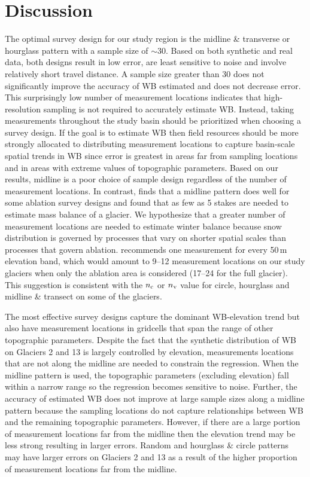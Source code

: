 \documentclass[twocolumn,letterpaper]{igs}
\begin{document}
\section{Discussion}

The optimal survey design for our study region is the midline \& transverse or hourglass pattern with a sample size of $\sim30$. Based on both synthetic and real data, both designs result in low error, are least sensitive to noise and involve relatively short travel distance. A sample size greater than 30 does not significantly improve the accuracy of WB estimated and does not decrease error. This surprisingly low number of measurement locations indicates that high-resolution sampling is not required to accurately estimate WB. Instead, taking measurements throughout the study basin should be prioritized when choosing a survey design. If the goal is to estimate WB then field resources should be more strongly allocated to distributing measurement locations to capture basin-scale spatial trends in WB since error is greatest in areas far from sampling locations and in areas with extreme values of topographic parameters. Based on our results, midline is a poor choice of sample design regardless of the number of measurement locations. In contrast, \citep{Surjanovic2016} finds that a midline pattern does well for some ablation survey designs and \cite{Fountain1999} found that as few as 5 stakes are needed to estimate mass balance of a glacier. We hypothesize that a greater number of measurement locations are needed to estimate winter balance because snow distribution is governed by processes that vary on shorter spatial scales than processes that govern ablation. \cite{Walmsley2015} recommends one measurement for every 50\,m elevation band, which would amount to 9--12 measurement locations on our study glaciers when only the ablation area is considered (17--24 for the full glacier). This suggestion is consistent with the $n_{\rm c}$ or $n_{\rm v}$ value for circle, hourglass and midline \& transect on some of the glaciers. 

The most effective survey designs capture the dominant WB-elevation trend but also have measurement locations in gridcells that span the range of other topographic parameters. Despite the fact that the synthetic distribution of WB on Glaciers 2 and 13 is largely controlled by elevation, measurements locations that are not along the midline are needed to constrain the regression. When the midline pattern is used, the topographic parameters (excluding elevation) fall within a narrow range so the regression becomes sensitive to noise. Further, the accuracy of estimated WB does not improve at large sample sizes along a midline pattern because the sampling locations do not capture relationships between WB and the remaining topographic parameters. However, if there are a large portion of measurement locations far from the midline then the elevation trend may be less strong resulting in larger errors. Random and hourglass \& circle patterns may have larger errors on Glaciers 2 and 13 as a result of the higher proportion of measurement locations far from the midline. 
\end{document}
